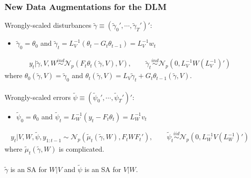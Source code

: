 \documentclass[xcolor=dvipsnames]{beamer}
\newcommand\N{\mathcal{N}}
\begin{document}
\begin{frame}
\frametitle{New Data Augmentations for the DLM}
{\color{blue}Wrongly-scaled disturbances $\tilde{\gamma}\equiv(\tilde{\gamma}_0',\cdots,\tilde{\gamma}_T')'$:}
\begin{itemize}
\item[]$\tilde{\gamma}_0=\theta_0$ and $\tilde{\gamma}_t=L_V^{-1}(\theta_t - G_t\theta_{t-1})=L_V^{-1}w_t$
\end{itemize}
\begin{align*}
  y_t|\tilde{\gamma},V,W \stackrel{ind}{\sim} \N_p\left(F_t\theta_t(\tilde{\gamma},V), V\right), \qquad 
  \tilde{\gamma}_t \stackrel{ind}{\sim} \N_p(0,L_V^{-1}W(L_V^{-1})')
\end{align*}
where $\theta_0(\tilde{\gamma},V)=\tilde{\gamma}_0$ and $\theta_t(\tilde{\gamma},V) = L_V\tilde{\gamma}_t + G_t\theta_{t-1}(\tilde{\gamma},V)$.\\~\\

{\color{blue}Wrongly-scaled errors $\tilde{\psi}\equiv(\tilde{\psi}_0',\cdots,\tilde{\psi}_T')'$:}
\begin{itemize}
\item[]$\tilde{\psi}_0=\theta_0$ and $\tilde{\psi}_t=L_W^{-1}(y_t - F_t\theta_{t})=L_W^{-1}v_t$
\end{itemize}
\begin{align*}
  y_t|V,W,\tilde{\psi},y_{1:t-1} \sim \N_p(\tilde{\mu}_t(\tilde{\gamma},W), F_tWF_t'), \qquad
  \tilde{\psi}_t  \stackrel{iid}{\sim} \N_p(0,L_W^{-1}V(L_W^{-1})')
\end{align*}
where $\tilde{\mu}_t(\tilde{\gamma},W)$ is complicated.\\~\\

{\color{blue} $\tilde{\gamma}$ is an SA for $W|V$ and $\tilde{\psi}$ is an SA for $V|W$.}
\end{frame}
\end{document}

